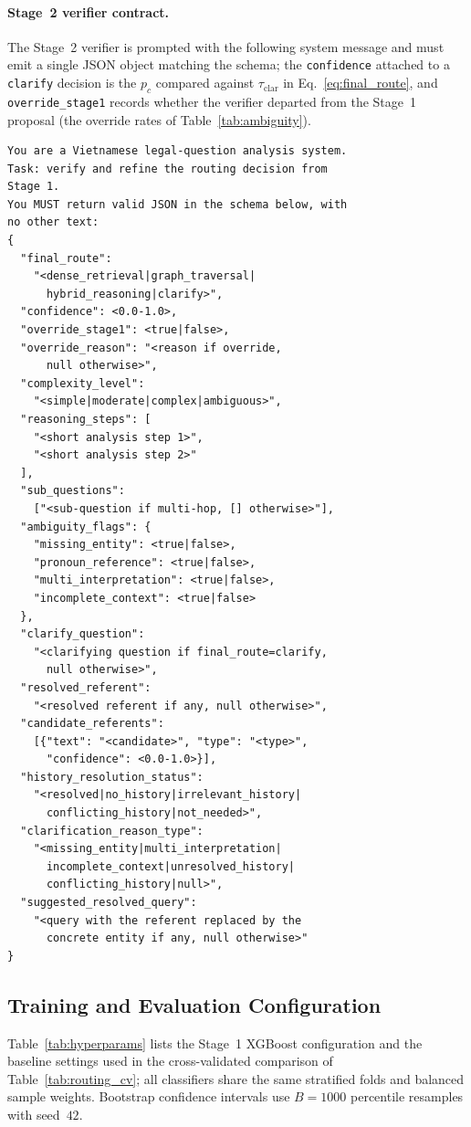 \documentclass[pdflatex,sn-mathphys-num]{sn-jnl}
\begin{document}
\paragraph{Stage~2 verifier contract.}
The Stage~2 verifier is prompted with the following system message and must
emit a single JSON object matching the schema; the \texttt{confidence}
attached to a \texttt{clarify} decision is the $p_c$ compared against
$\tau_{\mathrm{clar}}$ in Eq.~\eqref{eq:final_route}, and
\texttt{override\_stage1} records whether the verifier departed from the
Stage~1 proposal (the override rates of Table~\ref{tab:ambiguity}).

\begin{verbatim}
You are a Vietnamese legal-question analysis system.
Task: verify and refine the routing decision from
Stage 1.
You MUST return valid JSON in the schema below, with
no other text:
{
  "final_route":
    "<dense_retrieval|graph_traversal|
      hybrid_reasoning|clarify>",
  "confidence": <0.0-1.0>,
  "override_stage1": <true|false>,
  "override_reason": "<reason if override,
      null otherwise>",
  "complexity_level":
    "<simple|moderate|complex|ambiguous>",
  "reasoning_steps": [
    "<short analysis step 1>",
    "<short analysis step 2>"
  ],
  "sub_questions":
    ["<sub-question if multi-hop, [] otherwise>"],
  "ambiguity_flags": {
    "missing_entity": <true|false>,
    "pronoun_reference": <true|false>,
    "multi_interpretation": <true|false>,
    "incomplete_context": <true|false>
  },
  "clarify_question":
    "<clarifying question if final_route=clarify,
      null otherwise>",
  "resolved_referent":
    "<resolved referent if any, null otherwise>",
  "candidate_referents":
    [{"text": "<candidate>", "type": "<type>",
      "confidence": <0.0-1.0>}],
  "history_resolution_status":
    "<resolved|no_history|irrelevant_history|
      conflicting_history|not_needed>",
  "clarification_reason_type":
    "<missing_entity|multi_interpretation|
      incomplete_context|unresolved_history|
      conflicting_history|null>",
  "suggested_resolved_query":
    "<query with the referent replaced by the
      concrete entity if any, null otherwise>"
}
\end{verbatim}

\subsection{Training and Evaluation Configuration}\label{app:hyperparams}

Table~\ref{tab:hyperparams} lists the Stage~1 XGBoost configuration and the
baseline settings used in the cross-validated comparison of
Table~\ref{tab:routing_cv}; all classifiers share the same stratified folds
and balanced sample weights. Bootstrap confidence intervals use $B=1000$
percentile resamples with seed~$42$.
\end{document}
